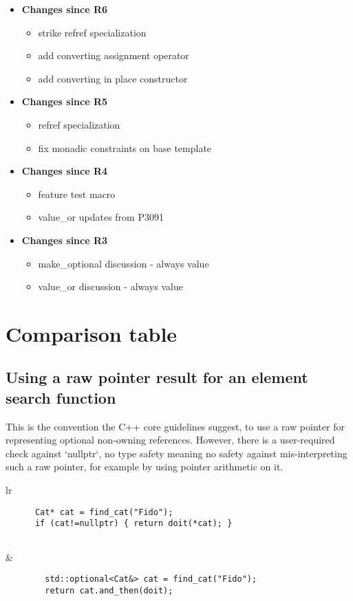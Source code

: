 \documentclass[a4paper,10pt,oneside,openany,final,article]{memoir}
\begin{document}
\begin{itemize}
  \item \textbf{Changes since R6}
  \begin{itemize}
  \item strike refref specialization
  \item add converting assignment operator
  \item add converting in place constructor
  \end{itemize}
  \item \textbf{Changes since R5}
  \begin{itemize}
  \item refref specialization
  \item fix monadic constraints on base template
  \end{itemize}
\item \textbf{Changes since R4}
  \begin{itemize}
  \item feature test macro
  \item value_or updates from P3091
  \end{itemize}
\item \textbf{Changes since R3}
  \begin{itemize}
  \item make_optional discussion - always value
  \item value_or discussion - always value
  \end{itemize}
\end{itemize}

\chapter{Comparison table}
\section{Using a raw pointer result for an element search function}

This is the convention the C++ core guidelines suggest, to use a raw pointer for representing optional non-owning references.
However, there is a user-required check against `nullptr`, no type safety meaning no safety against mis-interpreting such a raw pointer, for example by using pointer arithmetic on it.

\begin{tabular}{ lr }
  \begin{minipage}[t]{0.45\columnwidth}
    \begin{verbatim}
      Cat* cat = find_cat("Fido");
      if (cat!=nullptr) { return doit(*cat); }


    \end{verbatim}
  \end{minipage}
  &
    \begin{minipage}[t]{0.45\columnwidth}
      \begin{verbatim}
        std::optional<Cat&> cat = find_cat("Fido");
        return cat.and_then(doit);

      \end{verbatim}
    \end{minipage}
\end{tabular}
\end{document}
